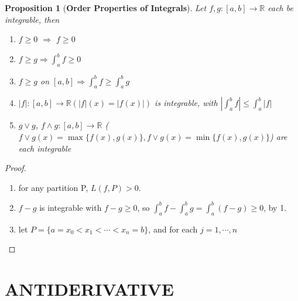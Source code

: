 \documentclass[12pt]{article}
\theoremstyle{plain}
\newtheorem{proposition}{Proposition}[subsection]
\newcommand{\abs}[1]{\left| #1 \right|}
\newcommand{\mR}{{\mathbb{R}}}
\begin{document}
	\begin{proposition}[\textbf{Order Properties of Integrals}]
		Let $f, g:[a,b]\to \mR$ each be integrable, then 
		\begin{enumerate}
			\item $f \geq 0$ $\Rightarrow$ $f \geq 0$
			\item $f \geq g \Rightarrow \int_a^b f \geq 0$
			\item $f \geq g$ on $[a,b] \Rightarrow \int_a^b f \geq \int_a^b g$
			\item $\abs{f} : [a,b] \to \mR (\abs{f}(x)= \abs{f(x)})$ 
				is integrable, with $\abs{\int_a^b f} \leq \int_a^b \abs f$
			\item $g \lor g$, $f\land g : [a,b] \to \mR$ 
				($f\lor g(x) = \max\{f(x), g(x)\} , 
				f\lor g(x) = \min \{f(x),g(x)\}$) are each integrable
		\end{enumerate}
	\end{proposition}
	\begin{proof}
		$ $
		\begin{enumerate}
			\item for any partition P, $L(f,P) > 0$. 
			\item $f - g$ is integrable with $f-g\geq 0$, 
				so $\int_a^b f - \int_a^b g = \int_a^b (f-g) \geq 0$, by 1. 
			\item let $P=\{a=x_0 <x_1 < \cdots< x_n=b\}$, and for each 
				$j=1,\cdots, n$ 
		\end{enumerate}
	\end{proof}



	
	\newpage 
	\section{ANTIDERIVATIVE}
\end{document}
